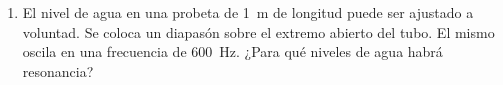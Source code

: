 \documentclass[11pt,spanish,a4paper]{article}
\begin{document}
\begin{enumerate}
\item El nivel de agua en una probeta de \SI{1}{\metre} de longitud puede ser ajustado a voluntad.
	Se coloca un diapasón sobre el extremo abierto del tubo.
	El mismo oscila en una frecuencia de \SI{600}{\hertz}.
	¿Para qué niveles de agua habrá resonancia?



\end{enumerate}
\end{document}
